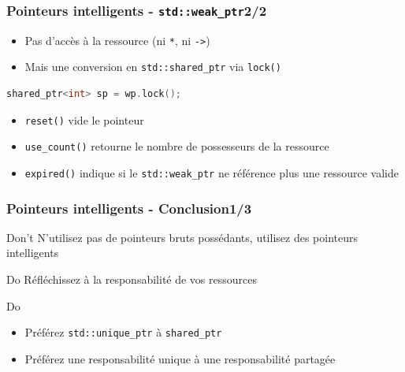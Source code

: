 \documentclass[C++.tex]{subfiles}
\begin{document}
\begin{frame}[fragile]
	\frametitle{Pointeurs intelligents - \lstinline|std::weak_ptr|\titlehfill{}2/2}
	\begin{itemize}
		\item Pas d'accès à la ressource (ni \lstinline|*|, ni \lstinline|->|)
		\item Mais une conversion en \lstinline|std::shared_ptr| via \lstinline|lock()|

	\end{itemize}

	\begin{lstlisting}[language=C++]
shared_ptr<int> sp = wp.lock();\end{lstlisting}

	\begin{itemize}
		\item \lstinline|reset()| vide le pointeur
		\item \lstinline|use_count()| retourne le nombre de possesseurs de la ressource


		\item \lstinline|expired()| indique si le \lstinline|std::weak_ptr| ne référence plus une ressource valide

	\end{itemize}
\end{frame}

\begin{frame}[fragile]
	\frametitle{Pointeurs intelligents - Conclusion\titlehfill{}1/3}
	\begin{alertblock}{Don't}
		N'utilisez pas de pointeurs bruts possédants, utilisez des pointeurs intelligents
	\end{alertblock}

	\begin{exampleblock}{Do}
		Réfléchissez à la responsabilité de vos ressources
	\end{exampleblock}

	\begin{exampleblock}{Do}
		\begin{itemize}
			\item Préférez \lstinline|std::unique_ptr| à \lstinline|shared_ptr|
			\item Préférez une responsabilité unique à une responsabilité partagée

		\end{itemize}
	\end{exampleblock}
\end{frame}
\end{document}

